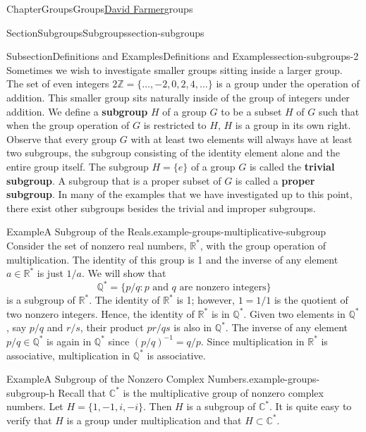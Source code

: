 \documentclass[oneside,10pt,]{book}
\newcommand{\terminology}[1]{\textbf{#1}}
\numberwithin{equation}{section}
\begin{document}
\begin{chapterptx}{Chapter}{Groups}{}{Groups}{\hyperlink{dfarmer}{David Farmer}}{}{groups}
\begin{sectionptx}{Section}{Subgroups}{}{Subgroups}{}{}{section-subgroups}
\begin{subsectionptx}{Subsection}{Definitions and Examples}{}{Definitions and Examples}{}{}{section-subgroups-2}
Sometimes we wish to investigate smaller groups sitting inside a larger group.   The set of even integers \(2{\mathbb Z} = \{\ldots, -2, 0, 2, 4, \ldots \}\) is a group  under the operation of addition. This smaller group sits naturally inside of the group of integers under addition.  We define a \terminology{subgroup} \(H\) of a group \(G\) to be a subset \(H\) of \(G\) such that when the group operation of \(G\) is restricted to \(H\), \(H\) is a group in its own right. Observe that every group \(G\) with at least two elements will always have at least two subgroups, the subgroup consisting of the identity element alone and the entire group itself. The subgroup \(H = \{ e \}\) of a group \(G\) is called the \terminology{trivial subgroup}.  A subgroup that is a proper subset of \(G\) is called a \terminology{proper subgroup}. In many of the examples that we have investigated up to this point, there exist other subgroups besides the trivial and improper subgroups.%
\begin{example}{Example}{A Subgroup of the Reals.}{example-groups-multiplicative-subgroup}%
Consider the set of nonzero real numbers, \({\mathbb R}^*\), with the group operation of multiplication. \label{example-groups-multiplicative-subgroup-2-2} The identity of this group is 1 and the inverse of any element \(a \in {\mathbb R}^*\) is just \(1/a\). We will show that%
\begin{equation*}
{\mathbb Q}^* = \{ p/q : p\text{ and }q\text{ are nonzero integers}\}
\end{equation*}
is a subgroup of \({\mathbb R}^*\). \label{example-groups-multiplicative-subgroup-2-7} The identity of \({\mathbb R}^*\) is 1; however,  \(1 = 1/1\) is the quotient of two nonzero integers. Hence, the identity of \({\mathbb R}^*\) is in \({\mathbb Q}^*\). Given two elements in \({\mathbb Q}^*\), say \(p/q\) and \(r/s\), their product \(pr/qs\) is also in \({\mathbb Q}^*\). The inverse of any element \(p/q \in {\mathbb Q}^*\) is again in \({\mathbb Q}^*\) since \((p/q)^{-1} = q/p\). Since multiplication in \({\mathbb R}^*\) is associative, multiplication in \({\mathbb Q}^*\) is associative.%
\end{example}
\begin{example}{Example}{A Subgroup of the Nonzero Complex Numbers.}{example-groups-subgroup-h}%
Recall that \({\mathbb C}^{\ast}\)  is the multiplicative group of nonzero complex numbers. Let \(H = \{ 1, -1, i, -i \}\). Then \(H\) is a subgroup of \({\mathbb C}^{\ast}\). It is quite easy to verify  that \(H\) is a group under multiplication and that \(H \subset {\mathbb C}^{\ast}\).%

\end{example}
\end{subsectionptx}
\end{sectionptx}
\end{chapterptx}
\end{document}
